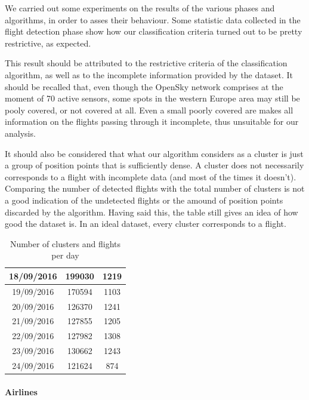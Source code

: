 \documentclass{vldb}
\begin{document}
We carried out some experiments on the results of the various phases and
algorithms, in order to asses their behaviour. Some statistic data collected in
the flight detection phase show how our classification criteria turned out to be
pretty restrictive, as expected.

This result should be attributed to the restrictive criteria of the
classification algorithm, as well as to the incomplete information provided by
the dataset. It should be recalled that, even though the OpenSky network
comprises at the moment of 70 active sensors, some spots in the western Europe
area may still be pooly covered, or not covered at all. Even a small poorly
covered are makes all information on the flights passing through it incomplete,
thus unsuitable for our analysis.

It should also be considered that what our algorithm considers as a cluster is
just a group of position points that is sufficiently dense. A cluster does not
necessarily corresponds to a flight with incomplete data (and most of the times
it doesn't). Comparing the number of detected flights with the total number of
clusters is not a good indication of the undetected flights or the amound of
position points discarded by the algorithm.
Having said this, the table still gives an idea of how good the dataset is. In
an ideal dataset, every cluster corresponds to a flight.

\begin{table}
  \centering
  \begin{tabular}{|c|c|c|}
  \hline
  18/09/2016 & 199030 & 1219 \\
  \hline
  19/09/2016 & 170594 & 1103 \\
  \hline
  20/09/2016 & 126370 & 1241 \\
  \hline
  21/09/2016 & 127855 & 1205 \\
  \hline
  22/09/2016 & 127982 & 1308 \\
  \hline
  23/09/2016 & 130662 & 1243 \\
  \hline
  24/09/2016 & 121624 & 874 \\
  \hline
  \end{tabular}
  \caption{Number of clusters and flights per day}
\end{table}

\paragraph{Airlines}
\end{document}
